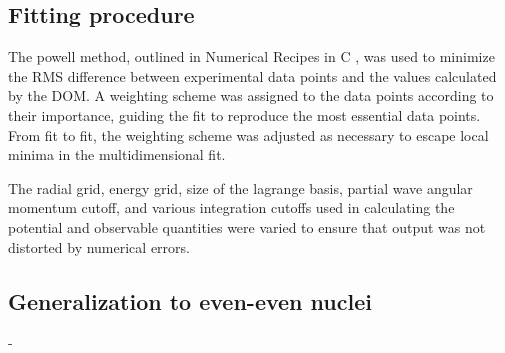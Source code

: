 \subsection{Fitting procedure}
The powell method, outlined in Numerical Recipes in C \cite{NumericalRecipes},
was used to minimize the RMS difference between experimental data points and the
values calculated by the DOM. A weighting scheme was assigned to the data points
according to their importance, guiding the fit to reproduce the most essential
data points. From fit to fit, the weighting scheme was adjusted as necessary to
escape local minima in the multidimensional fit.

The radial grid, energy grid, size of the lagrange basis, partial wave angular momentum cutoff, and
various integration cutoffs used in calculating the potential and
observable quantities were varied to ensure that output was not distorted by numerical errors. 

\subsection{Generalization to even-even nuclei}
- 

\afterpage{\clearpage}
